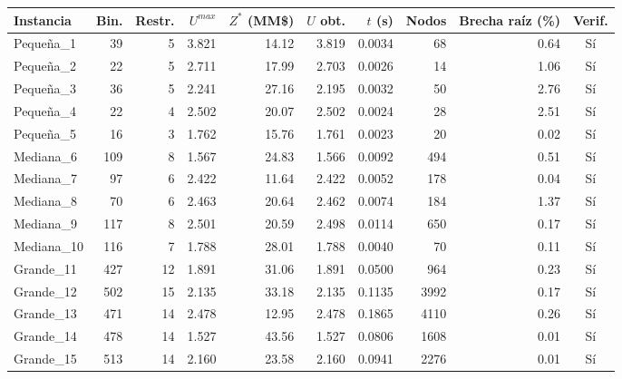 \begin{tabular}{|l|r|r|r|r|r|r|r|r|c|}
\hline
\textbf{Instancia} & \textbf{Bin.} & \textbf{Restr.} & \textbf{$U^{max}$} & \textbf{$Z^*$ (MM\$)} & \textbf{$U$ obt.} & \textbf{$t$ (s)} & \textbf{Nodos} & \textbf{Brecha raíz (\%)} & \textbf{Verif.} \\ \hline
Pequeña\_1 & 39 & 5 & 3.821 & 14.12 & 3.819 & 0.0034 & 68 & 0.64 & Sí \\ \hline
Pequeña\_2 & 22 & 5 & 2.711 & 17.99 & 2.703 & 0.0026 & 14 & 1.06 & Sí \\ \hline
Pequeña\_3 & 36 & 5 & 2.241 & 27.16 & 2.195 & 0.0032 & 50 & 2.76 & Sí \\ \hline
Pequeña\_4 & 22 & 4 & 2.502 & 20.07 & 2.502 & 0.0024 & 28 & 2.51 & Sí \\ \hline
Pequeña\_5 & 16 & 3 & 1.762 & 15.76 & 1.761 & 0.0023 & 20 & 0.02 & Sí \\ \hline
Mediana\_6 & 109 & 8 & 1.567 & 24.83 & 1.566 & 0.0092 & 494 & 0.51 & Sí \\ \hline
Mediana\_7 & 97 & 6 & 2.422 & 11.64 & 2.422 & 0.0052 & 178 & 0.04 & Sí \\ \hline
Mediana\_8 & 70 & 6 & 2.463 & 20.64 & 2.462 & 0.0074 & 184 & 1.37 & Sí \\ \hline
Mediana\_9 & 117 & 8 & 2.501 & 20.59 & 2.498 & 0.0114 & 650 & 0.17 & Sí \\ \hline
Mediana\_10 & 116 & 7 & 1.788 & 28.01 & 1.788 & 0.0040 & 70 & 0.11 & Sí \\ \hline
Grande\_11 & 427 & 12 & 1.891 & 31.06 & 1.891 & 0.0500 & 964 & 0.23 & Sí \\ \hline
Grande\_12 & 502 & 15 & 2.135 & 33.18 & 2.135 & 0.1135 & 3992 & 0.17 & Sí \\ \hline
Grande\_13 & 471 & 14 & 2.478 & 12.95 & 2.478 & 0.1865 & 4110 & 0.26 & Sí \\ \hline
Grande\_14 & 478 & 14 & 1.527 & 43.56 & 1.527 & 0.0806 & 1608 & 0.01 & Sí \\ \hline
Grande\_15 & 513 & 14 & 2.160 & 23.58 & 2.160 & 0.0941 & 2276 & 0.01 & Sí \\ \hline
\end{tabular}
